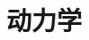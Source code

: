 \chapter{动力学}

\begin{comment}
\section{牛顿定律}

\subsection{概述}
中世纪到近代以来物理学的发展,\,可谓沧海桑田,\,旧的观点被否定,\,几十年以后突然又以全新的面貌出现在物理学理论中.\,其中,\,实验中观察到各种令人惊诧的结果,\,无论物理学所依托的数学形式一变再变,\,要说亘古不变的主题,\,恐怕只有自然界的神奇与深邃,\,和我等凡人难以参透其中奥妙却仍为之孜孜不倦研究的决心.\,物理是一门研究自然界存在的运动并提出解释与理解方法的学科.\,运动形式多种多样,\,变化万千,\,但很多都被我们或多或少地解释,\,其实总结来看,\,从古至今我们也仅仅拥有过两类解释:\,一类由牛顿提出,\,一类则来自爱因斯坦.\,前前后后经历了大概以下发展:


\end{comment}

